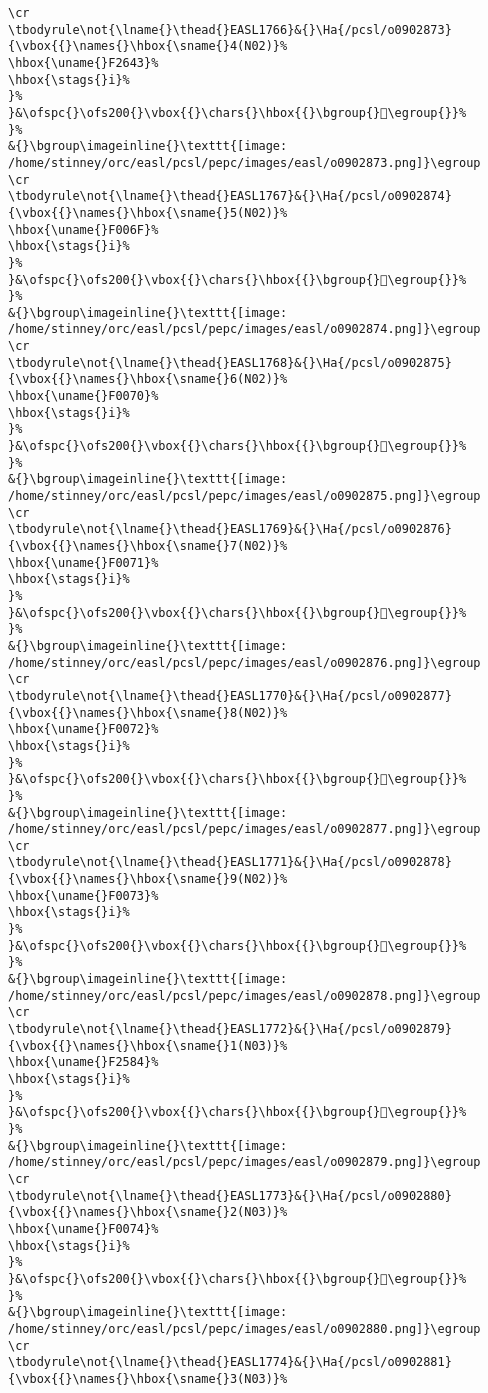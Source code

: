 \begin{verbatim}
\cr
\tbodyrule\not{\lname{}\thead{}EASL1766}&{}\Ha{/pcsl/o0902873}{\vbox{{}\names{}\hbox{\sname{}4(N02)}%
\hbox{\uname{}F2643}%
\hbox{\stags{}i}%
}%
}&\ofspc{}\ofs200{}\vbox{{}\chars{}\hbox{{}\bgroup{}󲙃\egroup{}}%
}%
&{}\bgroup\imageinline{}\texttt{[image: /home/stinney/orc/easl/pcsl/pepc/images/easl/o0902873.png]}\egroup
\cr
\tbodyrule\not{\lname{}\thead{}EASL1767}&{}\Ha{/pcsl/o0902874}{\vbox{{}\names{}\hbox{\sname{}5(N02)}%
\hbox{\uname{}F006F}%
\hbox{\stags{}i}%
}%
}&\ofspc{}\ofs200{}\vbox{{}\chars{}\hbox{{}\bgroup{}󰁯\egroup{}}%
}%
&{}\bgroup\imageinline{}\texttt{[image: /home/stinney/orc/easl/pcsl/pepc/images/easl/o0902874.png]}\egroup
\cr
\tbodyrule\not{\lname{}\thead{}EASL1768}&{}\Ha{/pcsl/o0902875}{\vbox{{}\names{}\hbox{\sname{}6(N02)}%
\hbox{\uname{}F0070}%
\hbox{\stags{}i}%
}%
}&\ofspc{}\ofs200{}\vbox{{}\chars{}\hbox{{}\bgroup{}󰁰\egroup{}}%
}%
&{}\bgroup\imageinline{}\texttt{[image: /home/stinney/orc/easl/pcsl/pepc/images/easl/o0902875.png]}\egroup
\cr
\tbodyrule\not{\lname{}\thead{}EASL1769}&{}\Ha{/pcsl/o0902876}{\vbox{{}\names{}\hbox{\sname{}7(N02)}%
\hbox{\uname{}F0071}%
\hbox{\stags{}i}%
}%
}&\ofspc{}\ofs200{}\vbox{{}\chars{}\hbox{{}\bgroup{}󰁱\egroup{}}%
}%
&{}\bgroup\imageinline{}\texttt{[image: /home/stinney/orc/easl/pcsl/pepc/images/easl/o0902876.png]}\egroup
\cr
\tbodyrule\not{\lname{}\thead{}EASL1770}&{}\Ha{/pcsl/o0902877}{\vbox{{}\names{}\hbox{\sname{}8(N02)}%
\hbox{\uname{}F0072}%
\hbox{\stags{}i}%
}%
}&\ofspc{}\ofs200{}\vbox{{}\chars{}\hbox{{}\bgroup{}󰁲\egroup{}}%
}%
&{}\bgroup\imageinline{}\texttt{[image: /home/stinney/orc/easl/pcsl/pepc/images/easl/o0902877.png]}\egroup
\cr
\tbodyrule\not{\lname{}\thead{}EASL1771}&{}\Ha{/pcsl/o0902878}{\vbox{{}\names{}\hbox{\sname{}9(N02)}%
\hbox{\uname{}F0073}%
\hbox{\stags{}i}%
}%
}&\ofspc{}\ofs200{}\vbox{{}\chars{}\hbox{{}\bgroup{}󰁳\egroup{}}%
}%
&{}\bgroup\imageinline{}\texttt{[image: /home/stinney/orc/easl/pcsl/pepc/images/easl/o0902878.png]}\egroup
\cr
\tbodyrule\not{\lname{}\thead{}EASL1772}&{}\Ha{/pcsl/o0902879}{\vbox{{}\names{}\hbox{\sname{}1(N03)}%
\hbox{\uname{}F2584}%
\hbox{\stags{}i}%
}%
}&\ofspc{}\ofs200{}\vbox{{}\chars{}\hbox{{}\bgroup{}󲖄\egroup{}}%
}%
&{}\bgroup\imageinline{}\texttt{[image: /home/stinney/orc/easl/pcsl/pepc/images/easl/o0902879.png]}\egroup
\cr
\tbodyrule\not{\lname{}\thead{}EASL1773}&{}\Ha{/pcsl/o0902880}{\vbox{{}\names{}\hbox{\sname{}2(N03)}%
\hbox{\uname{}F0074}%
\hbox{\stags{}i}%
}%
}&\ofspc{}\ofs200{}\vbox{{}\chars{}\hbox{{}\bgroup{}󰁴\egroup{}}%
}%
&{}\bgroup\imageinline{}\texttt{[image: /home/stinney/orc/easl/pcsl/pepc/images/easl/o0902880.png]}\egroup
\cr
\tbodyrule\not{\lname{}\thead{}EASL1774}&{}\Ha{/pcsl/o0902881}{\vbox{{}\names{}\hbox{\sname{}3(N03)}%

\end{verbatim}
